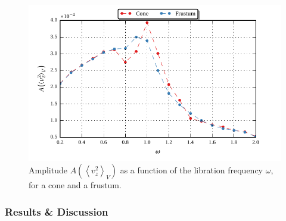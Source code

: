 \begin{figure}[!bp]
  \centering
  \includegraphics{gfx/cone/experiment/experiment.pdf}
  \caption{Amplitude $A\left(\left<v^2_z\right>_V\right)$ as a function of the libration frequency $\omega$,
            for a cone and a frustum.  \label{fig:cone_expseries} }
\end{figure}

\subsubsection{Results \& Discussion}
\label{cone:exp}

